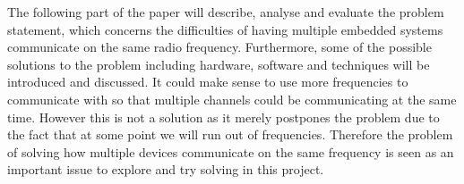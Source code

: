 \bigskip
The following part of the paper will describe, analyse and evaluate the problem statement, which concerns the difficulties of having multiple embedded systems communicate on the same radio frequency.
Furthermore, some of the possible solutions to the problem including hardware, software and techniques will be introduced and discussed.
It could make sense to use more frequencies to communicate with so that multiple channels could be communicating at the same time.
However this is not a solution as it merely postpones the problem due to the fact that at some point we will run out of frequencies. 
Therefore the problem of solving how multiple devices communicate on the same frequency is seen as an important issue to explore and try solving in this project.